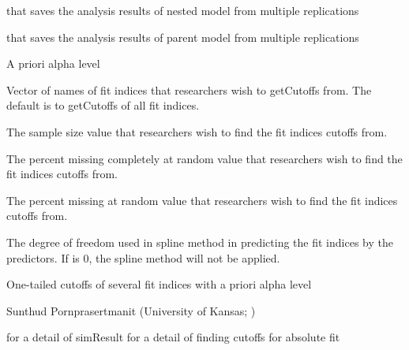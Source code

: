 \documentclass[a4paper]{book}
\begin{document}
\begin{Arguments}
\begin{ldescription}
\item[\code{nested}] 
 that saves the analysis results of nested model from multiple replications

\item[\code{parent}] 
 that saves the analysis results of parent model from multiple replications

\item[\code{alpha}] 
A priori alpha level

\item[\code{usedFit}] 
Vector of names of fit indices that researchers wish to getCutoffs from. The default is to getCutoffs of all fit indices.

\item[\code{nVal}] 
The sample size value that researchers wish to find the fit indices cutoffs from.

\item[\code{pmMCARval}] 
The percent missing completely at random value that researchers wish to find the fit indices cutoffs from.

\item[\code{pmMARval}] 
The percent missing at random value that researchers wish to find the fit indices cutoffs from.

\item[\code{df}] 
The degree of freedom used in spline method in predicting the fit indices by the predictors. If  is 0, the spline method will not be applied.

\end{ldescription}
\end{Arguments}
%
\begin{Value}
One-tailed cutoffs of several fit indices with a priori alpha level 
\end{Value}
%
\begin{Author}\relax
Sunthud Pornprasertmanit (University of Kansas; )
\end{Author}
%
\begin{SeeAlso}\relax
{} for a detail of simResult
 for a detail of finding cutoffs for absolute fit
\end{SeeAlso}
%
\end{document}
